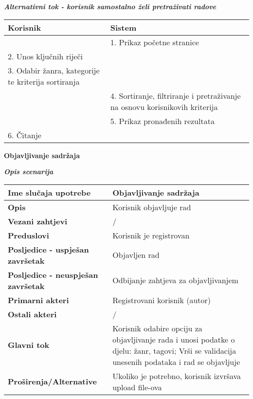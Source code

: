 \documentclass[12pt, a4paper]{report}
\begin{document}
\begin{flushleft}
\textbf{\textit{Alternativni tok - korisnik samostalno želi pretraživati radove}} \\
\begin{tabular}{|m{7cm}|m{7cm}|}
\hline
\textbf{Korisnik} & \textbf{Sistem} \\
\hline
 & 1. Prikaz početne stranice \\
\hline
2. Unos ključnih riječi &  \\
\hline
3. Odabir žanra, kategorije te kriterija sortiranja &  \\
\hline
 & 4. Sortiranje, filtriranje i pretraživanje na osnovu korisnikovih kriterija \\
\hline
 & 5. Prikaz pronađenih rezultata \\
\hline
6. Čitanje &  \\
\hline
\end{tabular} \newpage

{\large\textbf{Objavljivanje sadržaja}}  \newline

\textbf{\textit{Opis scenarija}} \\
\begin{tabular}{|m{7cm}|m{7cm}|} 
 \hline
 \textbf{Ime slučaja upotrebe} & Objavljivanje sadržaja \\ 
 \hline
 \textbf{Opis} & Korisnik objavljuje rad \\ 
 \hline
 \textbf{Vezani zahtjevi} & / \\ 
 \hline
 \textbf{Preduslovi} & Korisnik je registrovan \\ 
 \hline
 \textbf{Posljedice - uspješan završetak} & Objavljen rad \\ 
 \hline
 \textbf{Posljedice - neuspješan završetak} & Odbijanje zahtjeva za objavljivanjem \\ 
 \hline
 \textbf{Primarni akteri} & Registrovani korisnik (autor) \\ 
 \hline
 \textbf{Ostali akteri} & / \\ 
 \hline
 \textbf{Glavni tok} & Korisnik odabire opciju za objavljivanje rada i unosi podatke o djelu: žanr, tagovi; Vrši se validacija unesenih podataka i rad se objavljuje \\ 
 \hline
 \textbf{Proširenja/Alternative} & Ukoliko je potrebno, korisnik izvršava upload file-ova \\ 
 \hline
\end{tabular} \newpage


\end{flushleft}
\end{document}
